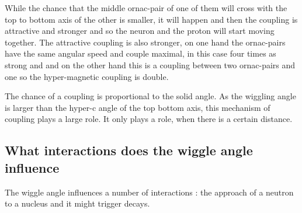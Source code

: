 While the chance that the middle ornac-pair of one of them will cross with the top to bottom axis of the other is smaller, it will happen and then the coupling is attractive and stronger and so the neuron and the proton will start moving together. The attractive coupling is also stronger, on one hand the ornac-pairs have the same angular speed and couple maximal, in this case four times as strong and and on the other hand this is a coupling between two ornac-pairs and one so the hyper-magnetic coupling is double.

The chance of a coupling is proportional to the solid angle. As the wiggling angle is larger than the hyper-c angle of the top bottom axis, this mechanism of coupling plays a large role. It only plays a role, when there is a certain distance.

\subsection{What interactions does the wiggle angle influence}
The wiggle angle influences a number of interactions : the approach of a neutron to a nucleus and it might trigger decays.


